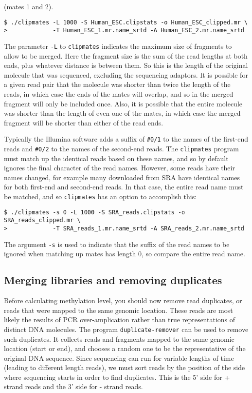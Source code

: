 \documentclass[10pt]{article}
\newcommand{\prog}[1]{\texttt{#1}}
\newcommand{\lit}[1]{\texttt{#1}}
\newcommand{\op}[1]{\texttt{#1}}
\begin{document}
(mates 1 and 2).
\begin{verbatim}
$ ./clipmates -L 1000 -S Human_ESC.clipstats -o Human_ESC_clipped.mr \
>             -T Human_ESC_1.mr.name_srtd -A Human_ESC_2.mr.name_srtd
\end{verbatim}
The parameter \op{-L} to \prog{clipmates} indicates the maximum size
of fragments to allow to be merged. Here the fragment size is the sum
of the read lengths at both ends, plus whatever distance is between
them. So this is the length of the original molecule that was
sequenced, excluding the sequencing adaptors. It is possible for a
given read pair that the molecule was shorter than twice the length of
the reads, in which case the ends of the mates will overlap, and so in
the merged fragment will only be included once. Also, it is possible
that the entire molecule was shorter than the length of even one of
the mates, in which case the merged fragment will be shorter than
either of the read ends.

Typically the Illumina software adds a suffix of \lit{\#0/1} to the
names of the first-end reads and \lit{\#0/2} to the names of the
second-end reads. The \prog{clipmates} program must match up the
identical reads based on these names, and so by default ignores the
final character of the read names. However, some reads have their
names changed, for example many downloaded from SRA have identical
names for both first-end and second-end reads. In that case, the
entire read name must be matched, and so \prog{clipmates} has an
option to accomplish this:
\begin{verbatim}
$ ./clipmates -s 0 -L 1000 -S SRA_reads.clipstats -o SRA_reads_clipped.mr \
>             -T SRA_reads_1.mr.name_srtd -A SRA_reads_2.mr.name_srtd
\end{verbatim}
The argument \lit{-s} is used to indicate that the suffix of the read
names to be ignored when matching up mates has length 0, so compare
the entire read name.

\subsection{Merging libraries and removing duplicates}
\label{sec:mapping}

Before calculating methylation level, you should now remove read
duplicates, or reads that were mapped to the same genomic
location. These reads are most likely the results of PCR
over-amplication rather than true representations of distinct DNA
molecules. The program \prog{duplicate-remover} can be used to remove
such duplicates. It collects reads and fragments mapped to the same
genomic location (start or end), and chooses a random one to be the
representative of the original DNA sequence.   Since sequencing can run
for variable lengths of time (leading to different length reads), we
must sort reads by the position of the side where sequencing starts
in order to find duplicates. This is the 5' side for + strand reads and
the 3' side for - strand reads.
\end{document}
